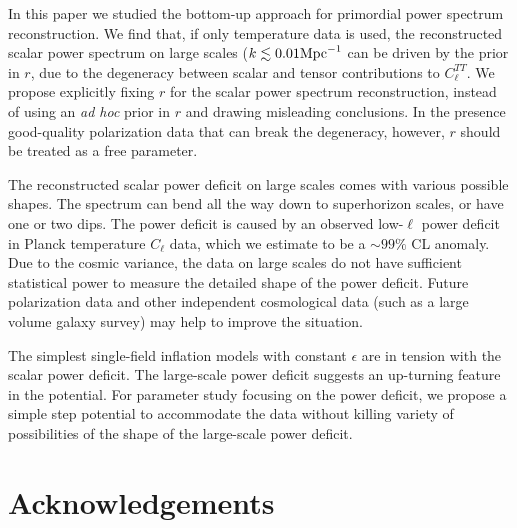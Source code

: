 \documentclass[a4paper,11pt]{article}
\begin{document}
In this paper we studied the bottom-up approach for primordial power spectrum reconstruction. We find that, if only temperature data is used, the reconstructed scalar power spectrum on large scales ($k\lesssim 0.01 {\rm Mpc}^{-1}$ can be driven by the prior in $r$, due to the degeneracy between scalar and tensor contributions to $C_\ell^{TT}$. We propose explicitly fixing $r$ for the scalar power spectrum reconstruction, instead of using an {\it ad hoc} prior in $r$ and drawing misleading conclusions. In the presence good-quality polarization data that can break the degeneracy, however, $r$ should be treated as a free parameter.

The reconstructed scalar power deficit on large scales comes with various possible shapes. The spectrum can bend all the way down to superhorizon scales, or have one or two dips. The power deficit is caused by an observed low-$\ell$ power deficit in Planck temperature $C_\ell$ data, which we estimate to be a $\sim 99\%$ CL anomaly. Due to the cosmic variance, the data on large scales do not have sufficient statistical power to measure the detailed shape of the power deficit. Future polarization data and other independent cosmological data (such as a large volume galaxy survey) may help to improve the situation.

The simplest single-field inflation models with constant $\epsilon$ are in tension with the scalar power deficit. The large-scale power deficit suggests an up-turning feature in the potential. For parameter study focusing on the power deficit, we propose a simple step potential to accommodate the data without killing variety of possibilities of the shape of the large-scale power deficit.

\section*{Acknowledgements}


  

\end{document}
